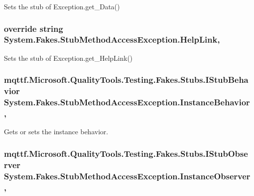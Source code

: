 Sets the stub of Exception.\-get\-\_\-\-Data()

\hypertarget{class_system_1_1_fakes_1_1_stub_method_access_exception_a72436783a398233a99ed87cbbe02a4d9}{
\subsubsection[{Help\-Link}]{\setlength{\rightskip}{0pt plus 5cm}override string System.\-Fakes.\-Stub\-Method\-Access\-Exception.\-Help\-Link\hspace{0.3cm}{\ttfamily [get]}, {\ttfamily [set]}}}\label{class_system_1_1_fakes_1_1_stub_method_access_exception_a72436783a398233a99ed87cbbe02a4d9}


Sets the stub of Exception.\-get\-\_\-\-Help\-Link()

\hypertarget{class_system_1_1_fakes_1_1_stub_method_access_exception_a4f45a8ac9af83c411daaacb1edaaad01}{
\subsubsection[{Instance\-Behavior}]{\setlength{\rightskip}{0pt plus 5cm}mqttf.\-Microsoft.\-Quality\-Tools.\-Testing.\-Fakes.\-Stubs.\-I\-Stub\-Behavior System.\-Fakes.\-Stub\-Method\-Access\-Exception.\-Instance\-Behavior\hspace{0.3cm}{\ttfamily [get]}, {\ttfamily [set]}}}\label{class_system_1_1_fakes_1_1_stub_method_access_exception_a4f45a8ac9af83c411daaacb1edaaad01}


Gets or sets the instance behavior.

\hypertarget{class_system_1_1_fakes_1_1_stub_method_access_exception_a8b9aafb05c0d198c04e5c825c77dc954}{
\subsubsection[{Instance\-Observer}]{\setlength{\rightskip}{0pt plus 5cm}mqttf.\-Microsoft.\-Quality\-Tools.\-Testing.\-Fakes.\-Stubs.\-I\-Stub\-Observer System.\-Fakes.\-Stub\-Method\-Access\-Exception.\-Instance\-Observer\hspace{0.3cm}{\ttfamily [get]}, {\ttfamily [set]}}}\label{class_system_1_1_fakes_1_1_stub_method_access_exception_a8b9aafb05c0d198c04e5c825c77dc954}


